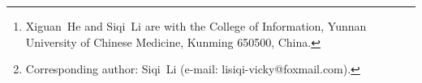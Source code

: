 \author{Xiguan~He and Siqi~Li%
\thanks{Xiguan~He and Siqi~Li are with the College of Information,
Yunnan University of Chinese Medicine, Kunming 650500, China.}%
\thanks{Corresponding author: Siqi~Li
(e-mail: lisiqi-vicky@foxmail.com).}%
}
